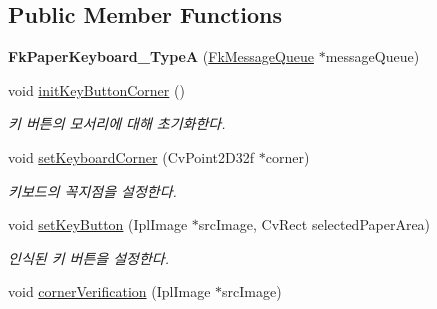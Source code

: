 \subsection*{Public Member Functions}
\begin{DoxyCompactItemize}
\item 
\hypertarget{class_fk_paper_keyboard___type_a_a281cc93ddf42e6ed5537c3bbf3fbdf27}{}{\bfseries Fk\+Paper\+Keyboard\+\_\+\+Type\+A} (\hyperlink{class_fk_message_queue}{Fk\+Message\+Queue} $\ast$message\+Queue)\label{class_fk_paper_keyboard___type_a_a281cc93ddf42e6ed5537c3bbf3fbdf27}

\item 
\hypertarget{class_fk_paper_keyboard___type_a_a6e21d2591fd9fe19a80c22dc0b21c798}{}void \hyperlink{class_fk_paper_keyboard___type_a_a6e21d2591fd9fe19a80c22dc0b21c798}{init\+Key\+Button\+Corner} ()\label{class_fk_paper_keyboard___type_a_a6e21d2591fd9fe19a80c22dc0b21c798}

\begin{DoxyCompactList}\small\item\em 키 버튼의 모서리에 대해 초기화한다. \end{DoxyCompactList}\item 
\hypertarget{class_fk_paper_keyboard___type_a_a3641dbd6eaf6199115e22d9da7facaac}{}void \hyperlink{class_fk_paper_keyboard___type_a_a3641dbd6eaf6199115e22d9da7facaac}{set\+Keyboard\+Corner} (Cv\+Point2\+D32f $\ast$corner)\label{class_fk_paper_keyboard___type_a_a3641dbd6eaf6199115e22d9da7facaac}

\begin{DoxyCompactList}\small\item\em 키보드의 꼭지점을 설정한다. \end{DoxyCompactList}\item 
\hypertarget{class_fk_paper_keyboard___type_a_a654106fa6a2e360f4062a9ba4af074de}{}void \hyperlink{class_fk_paper_keyboard___type_a_a654106fa6a2e360f4062a9ba4af074de}{set\+Key\+Button} (Ipl\+Image $\ast$src\+Image, Cv\+Rect selected\+Paper\+Area)\label{class_fk_paper_keyboard___type_a_a654106fa6a2e360f4062a9ba4af074de}

\begin{DoxyCompactList}\small\item\em 인식된 키 버튼을 설정한다. \end{DoxyCompactList}\item 
\hypertarget{class_fk_paper_keyboard___type_a_a8ff6ef3e507070572e129dbef1e684ce}{}void \hyperlink{class_fk_paper_keyboard___type_a_a8ff6ef3e507070572e129dbef1e684ce}{corner\+Verification} (Ipl\+Image $\ast$src\+Image)\label{class_fk_paper_keyboard___type_a_a8ff6ef3e507070572e129dbef1e684ce}


\end{DoxyCompactItemize}
